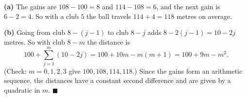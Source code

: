 \textbf{(a)} The gains are $108-100=8$ and $114-108=6$, and the next gain is $6-2=4$. So with a club $5$ the ball travels $114+4=\boxed{118}$ metres on average.

\textbf{(b)} Going from club $8-(j-1)$ to club $8-j$ adds $8-2(j-1)=10-2j$ metres. So with club $8-m$ the distance is
\[100+\sum_{j=1}^{m}(10-2j)=100+10m-m(m+1)=100+9m-m^2.\]
(Check: $m=0,1,2,3$ give $100,108,114,118$.) Since the gains form an arithmetic sequence, the distances have a constant second difference and are given by a quadratic in $m$. $\blacksquare$
